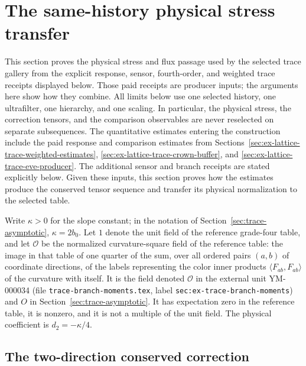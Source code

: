\section{The same-history physical stress transfer}
\label{sec:ex-lattice-trace-scribe-producer}

This section proves the physical stress and flux passage used by the
selected trace gallery from the explicit response, sensor, fourth-order,
and weighted trace receipts displayed below. Those paid receipts are
producer inputs; the arguments here show how they combine. All limits below use one selected history, one
ultrafilter, one hierarchy, and one scaling. In particular, the physical
stress, the correction tensors, and the comparison observables are never
reselected on separate subsequences. The quantitative estimates entering the
construction include the paid response and comparison estimates from
Sections~\ref{sec:ex-lattice-trace-weighted-estimates},
\ref{sec:ex-lattice-trace-crown-buffer}, and
\ref{sec:ex-lattice-trace-eve-producer}. The additional sensor and branch
receipts are stated explicitly below. Given these inputs, this section proves
how the estimates produce the conserved tensor sequence and transfer its
physical normalization to the selected table.

Write $\kappa>0$ for the slope constant; in the notation of
Section~\ref{sec:trace-asymptotic}, $\kappa=2b_0$. Let $1$ denote the unit
field of the reference grade-four table, and let $\mathcal O$ be the
normalized curvature-square field of the reference table: the image in
that table of one quarter of the sum, over all ordered pairs $(a,b)$ of
coordinate directions, of the labels representing the color inner
products $\langle F_{ab},F_{ab}\rangle$ of the curvature with itself. It is the field denoted
$\mathcal O$ in the external unit YM-000034 (file
\texttt{trace-branch-moments.tex}, label
\texttt{sec:ex-trace-branch-moments}) and $O$ in
Section~\ref{sec:trace-asymptotic}. It has expectation zero in the
reference table, it is nonzero, and it is not a multiple of the unit
field. The physical coefficient is $d_2=-\kappa/4$.

\subsection{The two-direction conserved correction}


